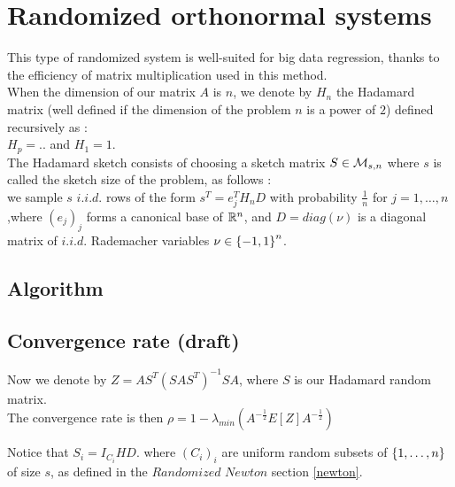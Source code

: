  

\chapter{Randomized orthonormal systems}

This type of randomized system is well-suited for big data regression, thanks to the efficiency of matrix multiplication used in this method.\\
When the dimension of our matrix $A$ is $n$, we denote by $H_{n}$ the Hadamard matrix (well defined if the dimension of the problem $n$ is a power of $2$) defined recursively as :\\

$H_{p} = ..$ and $H_{1} = 1.$\\

The Hadamard sketch consists of choosing a sketch matrix $S \in {\mathcal M}_{s,n}$ where $s$ is called the sketch size of the problem, as follows :\\ 
we sample $s$ $i.i.d.$ rows of the form $s^{T} = e_{j}^{T}H_{n} D $ with probability $\frac 1n$ for $j = 1,\dots,n$,where $(e_{j})_{j}$ forms a canonical base of ${\mathbb R}^{n}$, and $D = diag(\nu)$ is a diagonal matrix of $i.i.d.$ Rademacher variables $\nu \in \left\{-1,1\right\}^{n}$.  

%
%
%


\section{Algorithm}


\section{Convergence rate (draft)}



Now we denote by $Z = A S^{T} (S A S^{T})^{-1} S A$, where $S$ is our Hadamard random matrix.\\


The convergence rate is then $\rho = 1 - \lambda_{min}(A^{-\frac12}E[Z]A^{-\frac12}  )$

Notice that $S_{i} = I_{C_{i}} H D.$ where $(C_{i})_{i}$ are uniform random subsets of $\left\{1,\dots,n\right\}$ of size $s$, as defined in the $Randomized \,\,Newton$ section \ref{newton}.\\

